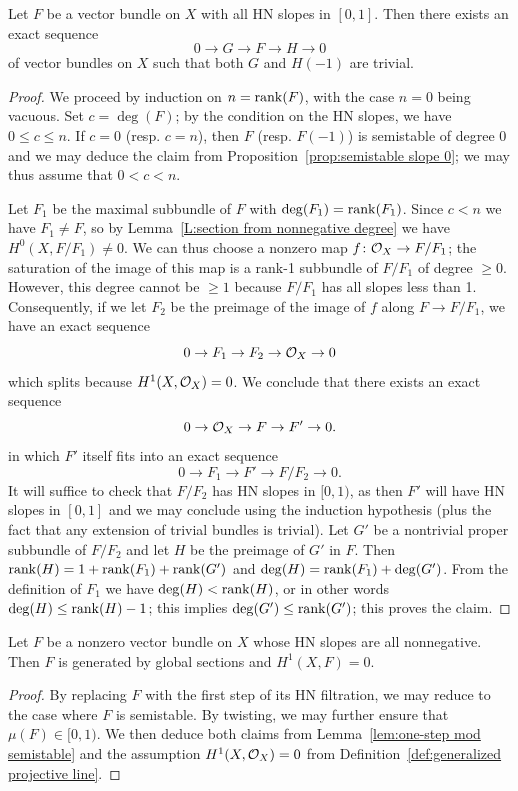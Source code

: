 \begin{lemma} \label{lem:one-step mod semistable}
Let $F$ be a vector bundle on $X$ with all HN slopes in $[0,1]$.
Then there exists an exact sequence
\[
0 \to G \to F \to H \to 0
\]
of vector bundles on $X$ such that both $G$ and $H(-1)$ are trivial.
\end{lemma}
\begin{proof}
We proceed by induction on $n = \operatorname{rank}(F)$, with the case $n=0$ being vacuous.
Set $c = \deg(F)$; by the condition on the HN slopes, we have $0 \leq c \leq n$.
If $c = 0$ (resp. $c = n$), then $F$ (resp. $F(-1)$)
is semistable of degree 0 and we may deduce the claim from Proposition~\ref{prop:semistable slope 0};
we may thus assume that $0 < c < n$.

Let $F_1$ be the maximal subbundle of $F$ with $\deg(F_1) = \operatorname{rank}(F_1)$.
Since $c < n$ we have $F_1 \neq F$, so by Lemma~\ref{L:section from nonnegative degree}
we have $H^0(X, F/F_1) \neq 0$. We can thus choose a nonzero map $f \colon \mathcal{O}_X \to F/F_1$;
the saturation of the image of this map is a rank-1 subbundle of $F/F_1$
of degree $\geq 0$. However, this degree cannot be $\geq 1$ because $F/F_1$ has all slopes less than 1.
Consequently, if we let $F_2$ be the preimage of the image of $f$ along $F \to F/F_1$,
we have an exact sequence 
\[
0 \to F_1 \to F_2 \to \mathcal{O}_X \to 0
\]
which splits because $H^1(X, \mathcal{O}_X) = 0$.
We conclude that there exists an exact sequence
\[
0 \to \mathcal{O}_X \to F \to F' \to 0.
\]
in which $F'$ itself fits into an exact sequence
\[
0 \to F_1 \to F' \to F/F_2 \to 0.
\]
It will suffice to check that $F/F_2$ has HN slopes in $[0,1)$,
as then $F'$ will have HN slopes in $[0,1]$ and we may conclude using the induction hypothesis
(plus the fact that any extension of trivial bundles is trivial).
Let $G'$ be a nontrivial proper subbundle of $F/F_2$ and let $H$ be the preimage of $G'$ in $F$.
Then $\operatorname{rank}(H) = 1 + \operatorname{rank}(F_1) + \operatorname{rank}(G')$ and $\deg(H) = \operatorname{rank}(F_1) + \deg(G')$.
From the definition of $F_1$ we have $\deg(H)< \operatorname{rank}(H)$, or in other words $\deg(H) \leq \operatorname{rank}(H) - 1$; this implies $\deg(G') \leq \operatorname{rank}(G')$; this proves the claim.
\end{proof}

\begin{corollary} \label{cor:slopes to sections}
Let $F$ be a nonzero vector bundle on $X$ whose HN slopes are all nonnegative.
Then $F$ is generated by global sections and $H^1(X, F) = 0$.
\end{corollary}
\begin{proof}
By replacing $F$ with the first step of its HN filtration, we may reduce to the case where $F$ is semistable. By twisting, we may further ensure that $\mu(F) \in [0,1)$. We then deduce both claims from Lemma~\ref{lem:one-step mod semistable} and the assumption $H^1(X, \mathcal{O}_X) = 0$ from Definition~\ref{def:generalized projective line}.
\end{proof}

